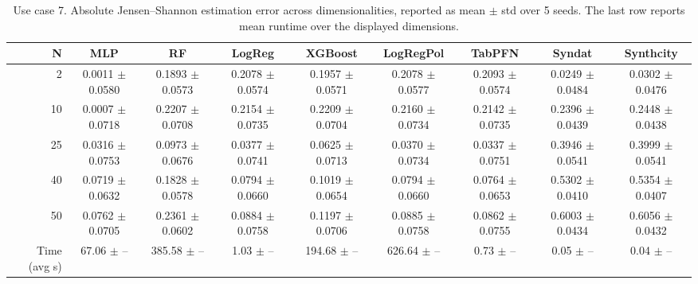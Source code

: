 \begin{table}[ht]
\centering
\small
\setlength{\tabcolsep}{3pt}
\caption{Use case 7. Absolute Jensen--Shannon estimation error across dimensionalities, reported as mean $\pm$ std over 5 seeds. The last row reports mean runtime over the displayed dimensions.}
\label{tab:uc7_abs_error_no_gt_mean_std}
\begin{tabular}{rcccccccc}
\toprule
N & MLP & RF & LogReg & XGBoost & LogRegPol & TabPFN & Syndat & Synthcity \\
\midrule
2 & 0.0011 $\pm$ 0.0580 & 0.1893 $\pm$ 0.0573 & 0.2078 $\pm$ 0.0574 & 0.1957 $\pm$ 0.0571 & 0.2078 $\pm$ 0.0577 & 0.2093 $\pm$ 0.0574 & 0.0249 $\pm$ 0.0484 & 0.0302 $\pm$ 0.0476 \\
10 & 0.0007 $\pm$ 0.0718 & 0.2207 $\pm$ 0.0708 & 0.2154 $\pm$ 0.0735 & 0.2209 $\pm$ 0.0704 & 0.2160 $\pm$ 0.0734 & 0.2142 $\pm$ 0.0735 & 0.2396 $\pm$ 0.0439 & 0.2448 $\pm$ 0.0438 \\
25 & 0.0316 $\pm$ 0.0753 & 0.0973 $\pm$ 0.0676 & 0.0377 $\pm$ 0.0741 & 0.0625 $\pm$ 0.0713 & 0.0370 $\pm$ 0.0734 & 0.0337 $\pm$ 0.0751 & 0.3946 $\pm$ 0.0541 & 0.3999 $\pm$ 0.0541 \\
40 & 0.0719 $\pm$ 0.0632 & 0.1828 $\pm$ 0.0578 & 0.0794 $\pm$ 0.0660 & 0.1019 $\pm$ 0.0654 & 0.0794 $\pm$ 0.0660 & 0.0764 $\pm$ 0.0653 & 0.5302 $\pm$ 0.0410 & 0.5354 $\pm$ 0.0407 \\
50 & 0.0762 $\pm$ 0.0705 & 0.2361 $\pm$ 0.0602 & 0.0884 $\pm$ 0.0758 & 0.1197 $\pm$ 0.0706 & 0.0885 $\pm$ 0.0758 & 0.0862 $\pm$ 0.0755 & 0.6003 $\pm$ 0.0434 & 0.6056 $\pm$ 0.0432 \\
Time (avg s) & 67.06 $\pm$ -- & 385.58 $\pm$ -- & 1.03 $\pm$ -- & 194.68 $\pm$ -- & 626.64 $\pm$ -- & 0.73 $\pm$ -- & 0.05 $\pm$ -- & 0.04 $\pm$ -- \\
\bottomrule
\end{tabular}
\end{table}